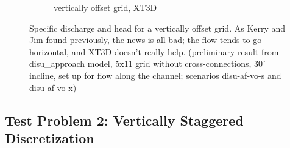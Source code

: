 \documentclass{article}
\begin{document}
\begin{figure}[H]
\begin{subfigure}{0.4\textwidth}
	\caption{vertically offset grid, XT3D}
	\label{fig:disu-x-nocc-head}
\end{subfigure}
\caption{Specific discharge and head for a vertically offset grid. As Kerry and Jim found previously, the news is all bad; the flow tends to go horizontal, and XT3D doesn't really help. (preliminary result from disu\_approach model, 5x11 grid without cross-connections, $30^{\circ}$ incline, set up for flow along the channel; scenarios disu-af-vo-s and disu-af-vo-x)}
\label{fig:figures}
\end{figure}

\subsection{Test Problem 2: Vertically Staggered Discretization}
\end{document}

